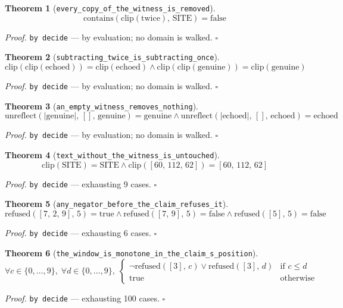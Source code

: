 \documentclass[11pt]{article}
\newtheorem{theorem}{Theorem}[section]
\begin{document}
\begin{theorem}[\texttt{every\_copy\_of\_the\_witness\_is\_removed}]
\[ \mathrm{contains}\mathopen{}\left(\mathrm{clip}\mathopen{}\left(\mathrm{twice}\right),\,\mathrm{SITE}\right) = \mathrm{false} \]
\end{theorem}
\noindent\emph{Proof.} \texttt{by decide} --- by evaluation; no domain is walked. \hfill$\square$

\begin{theorem}[\texttt{subtracting\_twice\_is\_subtracting\_once}]
\[ \mathrm{clip}\mathopen{}\left(\mathrm{clip}\mathopen{}\left(\mathrm{echoed}\right)\right) = \mathrm{clip}\mathopen{}\left(\mathrm{echoed}\right) \land \mathrm{clip}\mathopen{}\left(\mathrm{clip}\mathopen{}\left(\mathrm{genuine}\right)\right) = \mathrm{clip}\mathopen{}\left(\mathrm{genuine}\right) \]
\end{theorem}
\noindent\emph{Proof.} \texttt{by decide} --- by evaluation; no domain is walked. \hfill$\square$

\begin{theorem}[\texttt{an\_empty\_witness\_removes\_nothing}]
\[ \mathrm{unreflect}\mathopen{}\left(\left|\mathrm{genuine}\right|,\,[],\,\mathrm{genuine}\right) = \mathrm{genuine} \land \mathrm{unreflect}\mathopen{}\left(\left|\mathrm{echoed}\right|,\,[],\,\mathrm{echoed}\right) = \mathrm{echoed} \]
\end{theorem}
\noindent\emph{Proof.} \texttt{by decide} --- by evaluation; no domain is walked. \hfill$\square$

\begin{theorem}[\texttt{text\_without\_the\_witness\_is\_untouched}]
\[ \mathrm{clip}\mathopen{}\left(\mathrm{SITE}\right) = \mathrm{SITE} \land \mathrm{clip}\mathopen{}\left([60,\,112,\,62]\right) = [60,\,112,\,62] \]
\end{theorem}
\noindent\emph{Proof.} \texttt{by decide} --- exhausting 9 cases. \hfill$\square$

\begin{theorem}[\texttt{any\_negator\_before\_the\_claim\_refuses\_it}]
\[ \mathrm{refused}\mathopen{}\left([7,\,2,\,9],\,5\right) = \mathrm{true} \land \mathrm{refused}\mathopen{}\left([7,\,9],\,5\right) = \mathrm{false} \land \mathrm{refused}\mathopen{}\left([5],\,5\right) = \mathrm{false} \]
\end{theorem}
\noindent\emph{Proof.} \texttt{by decide} --- exhausting 6 cases. \hfill$\square$

\begin{theorem}[\texttt{the\_window\_is\_monotone\_in\_the\_claim\_s\_position}]
\[ \forall c \in \{0,\dots,9\},\; \forall d \in \{0,\dots,9\},\; \begin{cases}\lnot \mathrm{refused}\mathopen{}\left([3],\,c\right) \lor \mathrm{refused}\mathopen{}\left([3],\,d\right) & \text{if } c \le d\\ \mathrm{true} & \text{otherwise}\end{cases} \]
\end{theorem}
\noindent\emph{Proof.} \texttt{by decide} --- exhausting 100 cases. \hfill$\square$
\end{document}
